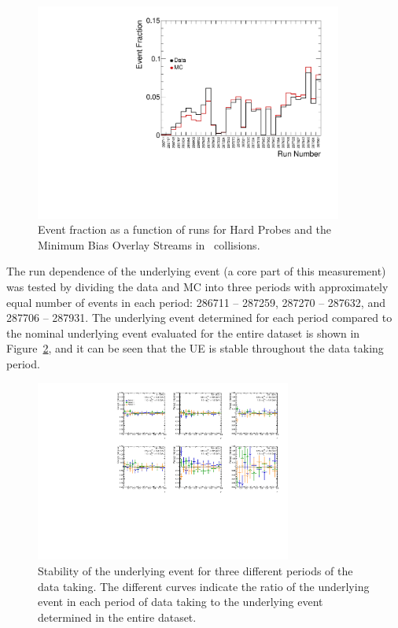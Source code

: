  \begin{figure}[h]
    \centerline{
       \includegraphics[width=0.9\textwidth]{figures/main/general/EventPercentages_c0.pdf}
    }
    \caption{Event fraction as a function of runs for Hard Probes and the Minimum Bias Overlay Streams in \pbpb\ collisions.}
    \label{fig:evnt_fraction}
 \end{figure}

The run dependence of the underlying event (a core part of this measurement) was tested by dividing the data and MC into three periods with approximately equal number of events in each period: 286711 -- 287259, 287270 -- 287632, and 287706 -- 287931.
The underlying event determined for each period compared to the nominal underlying event evaluated for the entire dataset is shown in Figure~\ref{fig:weighted_runs}, and it can be seen that the UE is stable throughout the data taking period.

 \begin{figure}[h]
    \centerline{
       \includegraphics[width=0.75\textwidth]{figures/main/general/weightedRuns.pdf}
    }
    \caption{Stability of the underlying event for three different periods of the data taking.
The different curves indicate the ratio of the underlying event in each period of data taking to the underlying event determined in the entire dataset.}
    \label{fig:weighted_runs}
 \end{figure}


